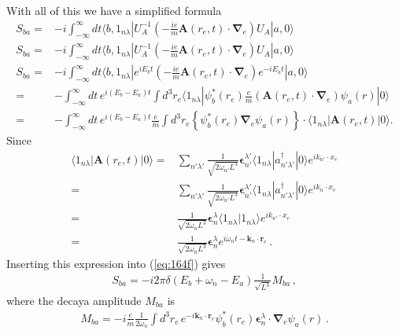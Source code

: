 With all of this we have a simplified formula
\begin{align}
\label{eq:164f}
  S_{ba}=&-i\int_{-\infty}^\infty dt\langle b,1_{n\lambda}|U_A^{-1}\left(-\frac{ie}{m}\mathbf{A}(r_e,t)\cdot\boldsymbol{\nabla}_e\right)
  U_A|a,0\rangle\nonumber\\
  S_{ba}=&-i\int_{-\infty}^\infty dt\langle b,1_{n\lambda}|U_A^{-1}\left(-\frac{ie}{m}\mathbf{A}(r_e,t)\cdot\boldsymbol{\nabla}_e\right)
  U_A|a,0\rangle\nonumber\\
  S_{ba}=&-i\int_{-\infty}^\infty dt\langle b,1_{n\lambda}|e^{iE_b t}\left(-\frac{ie}{m}\mathbf{A}(r_e,t)\cdot\boldsymbol{\nabla}_e\right)
  e^{-i E_a t}|a,0\rangle\nonumber\\
  =&-\int_{-\infty}^\infty dt\,e^{i(E_b-E_a)t}\int d^3r_e\langle1_{n\lambda}|\psi_b^*(r_e)\frac{e}{m}\left(\mathbf{A}(r_e,t)\cdot\boldsymbol{\nabla}_e\right)
  \psi_a(r)|0\rangle\nonumber\\
 =&-\int_{-\infty}^\infty dt\,e^{i(E_b-E_a)t}\frac{e}{m}\int d^3r_e\left\{\psi_b^*(r_e)\boldsymbol{\nabla}_e\psi_a(r)\right\}\cdot 
  \langle1_{n\lambda}|\mathbf{A}(r_e,t)|0\rangle.
\end{align}
Since
\begin{align}
  \langle1_{n\lambda}|\mathbf{A}(r_e,t)|0\rangle=&\sum_{n'\lambda'}\frac{1}{\sqrt{2\omega_{n'}L^3}}\boldsymbol{\epsilon}^{\lambda'}_{n'}
  \langle1_{n\lambda}|a^\dagger_{n'\lambda'}|0\rangle e^{i k_{n'}\cdot x_e}\nonumber\\
=&\sum_{n'\lambda'}\frac{1}{\sqrt{2\omega_{n'}L^3}}\boldsymbol{\epsilon}^{\lambda'}_{n'}
  \langle1_{n\lambda}|a^\dagger_{n'\lambda'}|0\rangle e^{i k_{n}\cdot x_e}\nonumber\\
=&\frac{1}{\sqrt{2\omega_{n}L^3}}\boldsymbol{\epsilon}^{\lambda}_{n}
  \langle1_{n\lambda}|1_{n\lambda}\rangle e^{i k_{n'}\cdot x_e}\nonumber\\
=&\frac{1}{\sqrt{2\omega_{n}L^3}}\boldsymbol{\epsilon}^{\lambda}_{n}
  e^{i \omega_n t-\mathbf{k}_n\cdot\mathbf{r}_e}\,.
\end{align}
Inserting this expression into (\ref{eq:164f}) gives
\begin{align}
  S_{ba}=-i2\pi \delta(E_b+\omega_n-E_a)\frac{1}{\sqrt{L^3}}M_{ba}\,, 
\end{align}
where the decaya amplitude $M_{ba}$ is
\begin{align}
  M_{ba}=-i\frac{e}{m}\frac{1}{2\omega_n}\int d^3r_e\,e^{-i\mathbf{k}_n\cdot\mathbf{r}_e}
  \psi_b^*(r_e)\boldsymbol{\epsilon}^{\lambda}_{n}\cdot\boldsymbol{\nabla}_e\psi_a(r)\,.
\end{align}
